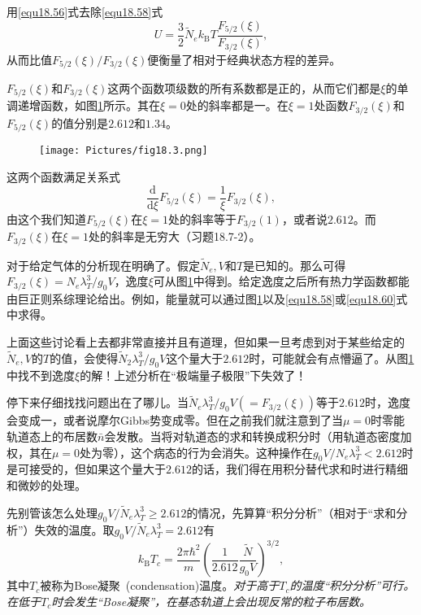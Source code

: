 用\eqref{equ18.56}式去除\eqref{equ18.58}式
\begin{equation}
U=\frac{3}{2}\tilde N_ek_\text{B}T\frac{F_{5/2}(\xi)}{F_{3/2}(\xi)},
\label{equ18.60}
\end{equation}
从而比值$F_{5/2}(\xi)/F_{3/2}(\xi)$便衡量了相对于经典状态方程的差异。

$F_{5/2}(\xi)$和$F_{3/2}(\xi)$这两个函数项级数的所有系数都是正的，从而它们都是$\xi$的单调递增函数，如图\ref{fig18.3}所示。其在$\xi=0$处的斜率都是一。在$\xi=1$处函数$F_{3/2}(\xi)$和$F_{5/2}(\xi)$的值分别是$2.612$和$1.34$。

\begin{figure}
\texttt{[image: Pictures/fig18.3.png]}
\label{fig18.3}
\end{figure}

这两个函数满足关系式
\begin{equation}
\frac{\mathrm d}{\mathrm d\xi}F_{5/2}(\xi)=\frac{1}{\xi}F_{3/2}(\xi),
\end{equation}
由这个我们知道$F_{5/2}(\xi)$在$\xi=1$处的斜率等于$F_{3/2}(1)$，或者说$2.612$。而$F_{3/2}(\xi)$在$\xi=1$处的斜率是无穷大（习题18.7-2）。

对于给定气体的分析现在明确了。假定$\tilde N_e,V$和$T$是已知的。那么可得$F_{3/2}(\xi)=N_e\lambda_T^3/g_0V$，逸度$\xi$可从图\ref{fig18.3}中得到。给定逸度之后所有热力学函数都能由巨正则系综理论给出。例如，能量就可以通过图\ref{fig18.3}以及\eqref{equ18.58}或\eqref{equ18.60}式中求得。

上面这些讨论看上去都非常直接并且有道理，但如果一旦考虑到对于某些给定的$\tilde N_e,V$的$T$的值，会使得$\tilde N_2\lambda_T^3/g_0V$这个量大于$2.612$时，可能就会有点懵逼了。从图\ref{fig18.3}中找不到逸度$\xi$的解！上述分析在``极端量子极限''下失效了！

停下来仔细找找问题出在了哪儿。当$\tilde N_e\lambda_T^3/g_0V(=F_{3/2}(\xi))$等于$2.612$时，逸度会变成一，或者说摩尔Gibbs势变成零。但在之前我们就注意到了当$\mu=0$时零能轨道态上的布居数$\bar n$会发散。当将对轨道态的求和转换成积分时（用轨道态密度加权，其在$\mu=0$处为零），这个病态的行为会消失。这种操作在$g_0V/N_e\lambda_T^3<2.612$时是可接受的，但如果这个量大于$2.612$的话，我们得在用积分替代求和时进行精细和微妙的处理。

先别管该怎么处理$g_0V/\tilde N_e\lambda_T^3\ge 2.612$的情况，先算算``积分分析''（相对于``求和分析''）失效的温度。取$g_0V/\tilde N_e\lambda_T^3=2.612$有
\begin{equation}
k_\text{B}T_c=\frac{2\pi\hbar^2}{m}\left(\frac{1}{2.612}\frac{\tilde N}{g_0V}\right)^{3/2},
\label{equ18.62}
\end{equation}
其中$T_c$被称为Bose凝聚~(condensation)温度。{\it 对于高于$T_c$的温度``积分分析''可行。在低于$T_c$时会发生``Bose凝聚''，在基态轨道上会出现反常的粒子布居数。}

